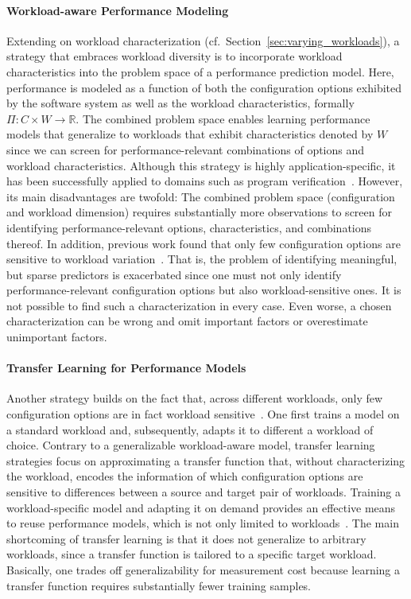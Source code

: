 {\paragraph{Workload-aware Performance Modeling}
\label{sec:workload-aware}
Extending on workload characterization (cf.~Section~\ref{sec:varying_workloads}), a strategy that embraces workload diversity is to incorporate workload characteristics into the problem space of a performance prediction model. Here, performance is modeled as a function of both the configuration options exhibited by the software system as well as the workload characteristics, formally $\Pi: C \times W \rightarrow \mathbb{R}$.
The combined problem space enables learning performance models that generalize to workloads that exhibit characteristics denoted by $W$ since we can screen for performance-relevant combinations of options and workload characteristics. Although this strategy is highly application-specific, it has been successfully applied to domains such as program verification~\cite{koc_satune_2021}. However, its main disadvantages are twofold: The combined problem space (configuration and workload dimension) requires substantially more observations to screen for identifying performance-relevant options, characteristics, and combinations thereof. In addition, previous work  found that  only few configuration options are sensitive to workload variation~\cite{jamishidi_transfer_2017}. That is, the problem of identifying meaningful, but sparse predictors is exacerbated since one must not only identify performance-relevant configuration options but also workload-sensitive ones. {\color{edited} It is not possible to find such a characterization in every case. Even worse, a chosen characterization can be wrong and omit important factors or overestimate unimportant factors.}


\paragraph{Transfer Learning for Performance Models}\label{sec:transfer}
Another strategy builds on the fact that, across different workloads, only few configuration options are in fact workload sensitive~\cite{jamishidi_transfer_2017}. One first trains a model on a standard workload and, subsequently, adapts it to different a workload of choice. Contrary to a generalizable workload-aware model, transfer learning strategies focus on approximating a transfer function that, without characterizing the workload, encodes the information of which configuration options are sensitive to differences between a source and target pair of workloads. Training a workload-specific model and adapting it on demand provides an effective means to reuse performance models, which is not only limited to workloads~\cite{jamshidi_learning_2018, ding_bayesian_2020,valov_transferring_performance_2017,martin_transfer_2021}. The main shortcoming of transfer learning is that it does not generalize to arbitrary workloads, since a transfer function is tailored to a specific target workload. Basically, one trades off generalizability for measurement cost because learning a transfer function requires substantially fewer training samples.

}

